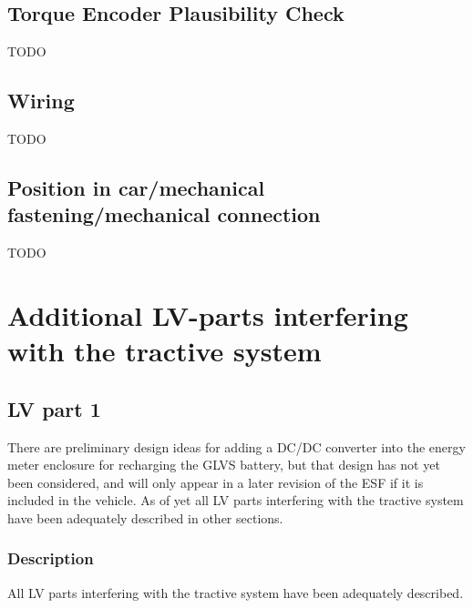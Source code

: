 \documentclass{article}
\begin{document}
\subsection{Torque Encoder Plausibility Check}\label{torque_encoder_plausibility_check}
TODO

\subsection{Wiring}
TODO

\subsection{Position in car/mechanical fastening/mechanical connection}
TODO

\section{Additional LV-parts interfering with the tractive system}
\subsection{LV part 1}
There are preliminary design ideas for adding a DC/DC converter into the energy meter enclosure for recharging the GLVS battery, but that design has not yet been considered, and will only appear in a later revision of the ESF if it is included in the vehicle. As of yet all LV parts interfering with the tractive system have been adequately described in other sections.

\subsubsection{Description}
All LV parts interfering with the tractive system have been adequately described. 
\end{document}
